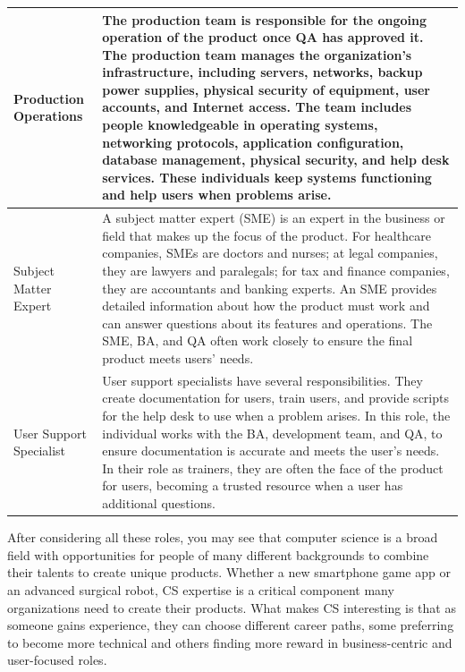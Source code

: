 \begin{longtable}[H]{p{.8in}|p{3.6in}}
	\hline
	\Tstrut Production Operations  & The production team is responsible for the ongoing operation of the product once QA has approved it. The production team manages the organization's infrastructure, including servers, networks, backup power supplies, physical security of equipment, user accounts, and Internet access. The team includes people knowledgeable in operating systems, networking protocols, application configuration, database management, physical security, and help desk services. These individuals keep systems functioning and help users when problems arise.\\
	\hline
	\Tstrut Subject \linebreak Matter \linebreak Expert & A subject matter expert (SME) is an expert in the business or field that makes up the focus of the product. For healthcare companies, SMEs are doctors and nurses; at legal companies, they are lawyers and paralegals; for tax and finance companies, they are accountants and banking experts. An SME provides detailed information about how the product must work and can answer questions about its features and operations. The SME, BA, and QA often work closely to ensure the final product meets users' needs.\\
	\hline
	\Tstrut User \linebreak Support \linebreak Specialist & User support specialists have several responsibilities. They create documentation for users, train users, and provide scripts for the help desk to use when a problem arises. In this role, the individual works with the BA, development team, and QA, to ensure documentation is accurate and meets the user's needs. In their role as trainers, they are often the face of the product for users, becoming a trusted resource when a user has additional questions.\\ 
	\bottomrule
\end{longtable}


After considering all these roles, you may see that computer science is a broad field with opportunities for people of many different backgrounds to combine their talents to create unique products. Whether a new smartphone game app or an advanced surgical robot, CS expertise is a critical component many organizations need to create their products. What makes CS interesting is that as someone gains experience, they can choose different career paths, some preferring to become more technical and others finding more reward in business-centric and user-focused roles.

